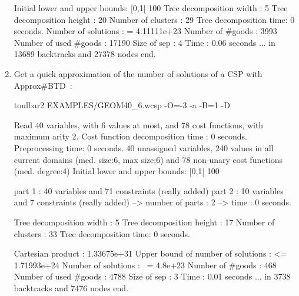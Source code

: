 \begin{enumerate}
{\begin{DoxyCode}
Initial lower and upper bounds: [0,1[ 100%
Tree decomposition width  : 5
Tree decomposition height : 20
Number of clusters        : 29
Tree decomposition time: 0 seconds.
Number of solutions    : =  4.11111e+23
Number of #goods       :    3993
Number of used #goods  :    17190
Size of sep            :    4
Time                   :    0.06 seconds
... in 13689 backtracks and 27378 nodes
end.
\end{DoxyCode}}
\item Get a quick approximation of the number of solutions of a CSP with Approx\#BTD~\cite{Favier09a}:
\begin{DoxyCode}
	toulbar2 EXAMPLES/GEOM40_6.wcsp -O=-3 -a -B=1 -D
\end{DoxyCode}
{\scriptsize
\begin{DoxyCode}
Read 40 variables, with 6 values at most, and 78 cost functions, with maximum arity 2.
Cost function decomposition time : 0 seconds.
Preprocessing time: 0 seconds.
40 unassigned variables, 240 values in all current domains (med. size:6, max size:6) and 78 non-unary cost functions (med. degree:4)
Initial lower and upper bounds: [0,1[ 100%

part 1 : 40 variables and 71 constraints (really added)
part 2 : 10 variables and 7 constraints (really added)
--> number of parts : 2
--> time : 0 seconds. 

Tree decomposition width  : 5
Tree decomposition height : 17
Number of clusters        : 33
Tree decomposition time: 0 seconds.

Cartesian product 		   :    1.33675e+31
Upper bound of number of solutions : <= 1.71993e+24
Number of solutions    : ~= 4.8e+23
Number of #goods       :    468
Number of used #goods  :    4788
Size of sep            :    3
Time                   :    0.01 seconds
... in 3738 backtracks and 7476 nodes
end.
\end{DoxyCode}}
\end{enumerate}
